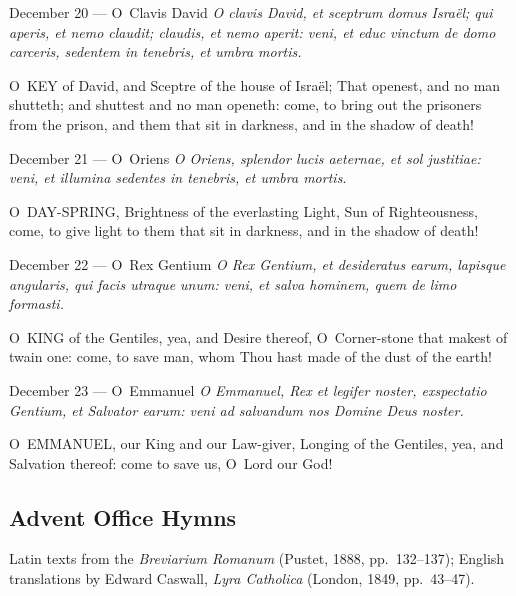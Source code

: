 \begin{massbox}{December 20 --- O~Clavis David}
\textit{O clavis David, et sceptrum domus Isra\"el; qui aperis, et nemo claudit; claudis, et nemo aperit: veni, et educ vinctum de domo carceris, sedentem in tenebris, et umbra mortis.}

\medskip
O~KEY of David, and Sceptre of the house of Isra\"el; That openest, and no man shutteth; and shuttest and no man openeth: come, to bring out the prisoners from the prison, and them that sit in darkness, and in the shadow of death!
\end{massbox}

\begin{massbox}{December 21 --- O~Oriens}
\textit{O Oriens, splendor lucis aeternae, et sol justitiae: veni, et illumina sedentes in tenebris, et umbra mortis.}

\medskip
O~DAY-SPRING, Brightness of the everlasting Light, Sun of Righteousness, come, to give light to them that sit in darkness, and in the shadow of death!
\end{massbox}

\begin{massbox}{December 22 --- O~Rex Gentium}
\textit{O Rex Gentium, et desideratus earum, lapisque angularis, qui facis utraque unum: veni, et salva hominem, quem de limo formasti.}

\medskip
O~KING of the Gentiles, yea, and Desire thereof, O~Corner-stone that makest of twain one: come, to save man, whom Thou hast made of the dust of the earth!
\end{massbox}

\begin{massbox}{December 23 --- O~Emmanuel}
\textit{O Emmanuel, Rex et legifer noster, exspectatio Gentium, et Salvator earum: veni ad salvandum nos Domine Deus noster.}

\medskip
O~EMMANUEL, our King and our Law-giver, Longing of the Gentiles, yea, and Salvation thereof: come to save us, O~Lord our God!
\end{massbox}

\subsection{Advent Office Hymns}

Latin texts from the \textit{Breviarium Romanum} (Pustet, 1888, pp.~132--137); English translations by Edward Caswall, \textit{Lyra Catholica} (London, 1849, pp.~43--47).

